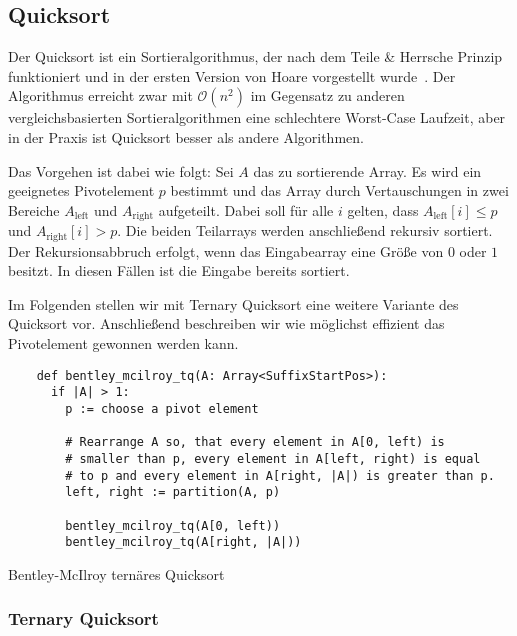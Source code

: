 \subsection{Quicksort}
\label{section:quicksort}

Der  Quicksort ist ein Sortieralgorithmus,
der nach dem Teile \& Herrsche Prinzip funktioniert und
in der ersten Version von Hoare vorgestellt wurde~\cite{quicksort}.
Der Algorithmus erreicht zwar mit $\mathcal O(n^2)$ im Gegensatz zu anderen
vergleichsbasierten Sortieralgorithmen eine schlechtere Worst-Case Laufzeit,
aber in der Praxis ist Quicksort besser als andere Algorithmen.

Das Vorgehen ist dabei wie folgt: Sei $A$ das zu sortierende Array.
Es wird ein geeignetes Pivotelement $p$ bestimmt und das Array durch Vertauschungen in
zwei Bereiche $A_{\text{left}}$ und $A_{\text{right}}$ aufgeteilt.
Dabei soll für alle $i$ gelten, dass $A_{\text{left}}[i] \le p$ und $A_{\text{right}}[i] > p$.
Die beiden Teilarrays werden anschließend rekursiv sortiert.
Der Rekursionsabbruch erfolgt, wenn das Eingabearray eine Größe von $0$ oder $1$ besitzt.
In diesen Fällen ist die Eingabe bereits sortiert.

Im Folgenden stellen wir mit Ternary Quicksort eine weitere Variante des Quicksort vor.
Anschließend beschreiben wir wie möglichst effizient das Pivotelement gewonnen werden kann.

\begin{listing}[!h]
    \begin{verbatim}
    def bentley_mcilroy_tq(A: Array<SuffixStartPos>):
      if |A| > 1:
        p := choose a pivot element
    
        # Rearrange A so, that every element in A[0, left) is
        # smaller than p, every element in A[left, right) is equal
        # to p and every element in A[right, |A|) is greater than p.
        left, right := partition(A, p)
    
        bentley_mcilroy_tq(A[0, left))
        bentley_mcilroy_tq(A[right, |A|))
    \end{verbatim}
    \caption{Bentley-McIlroy ternäres Quicksort~\cite{ternary_quicksort}}
\end{listing}    

\subsubsection{Ternary Quicksort}
\label{section:ternary_quicksort}

